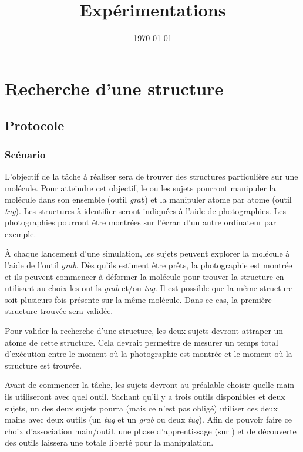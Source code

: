 \documentclass[a4paper,fleqn]{report}
\title{Expérimentations}
\author{}
\date{\today}
\begin{document}
	\maketitle
	\chapter{Recherche d'une structure}
		\section{Protocole}
			\subsection{Scénario}
				L'objectif de la tâche à réaliser sera de trouver des structures particulière sur une molécule.
				Pour atteindre cet objectif, le ou les sujets pourront manipuler la molécule dans son ensemble (outil \emph{grab}) et la manipuler atome par atome (outil \emph{tug}).
				Les structures à identifier seront indiquées à l'aide de photographies.
				Les photographies pourront être montrées sur l'écran d'un autre ordinateur par exemple.

				À chaque lancement d'une simulation, les sujets peuvent explorer la molécule à l'aide de l'outil \emph{grab}.
				Dès qu'ils estiment être prêts, la photographie est montrée et ils peuvent commencer à déformer la molécule pour trouver la structure en utilisant au choix les outils \emph{grab} et/ou \emph{tug}.
				Il est possible que la même structure soit plusieurs fois présente sur la même molécule.
				Dans ce cas, la première structure trouvée sera validée.

				Pour valider la recherche d'une structure, les deux sujets devront attraper un atome de cette structure.
				Cela devrait permettre de mesurer un temps total d'exécution entre le moment où la photographie est montrée et le moment où la structure est trouvée.

				Avant de commencer la tâche, les sujets devront au préalable choisir quelle main ils utiliseront avec quel outil.
				Sachant qu'il y a trois outils disponibles et deux sujets, un des deux sujets pourra (mais ce n'est pas obligé) utiliser ces deux mains avec deux outils (un \emph{tug} et un \emph{grab} ou deux \emph{tug}).
				Afin de pouvoir faire ce choix d'association main/outil, une phase d'apprentissage (sur ) et de découverte des outils laissera une totale liberté pour la manipulation.
\end{document}
